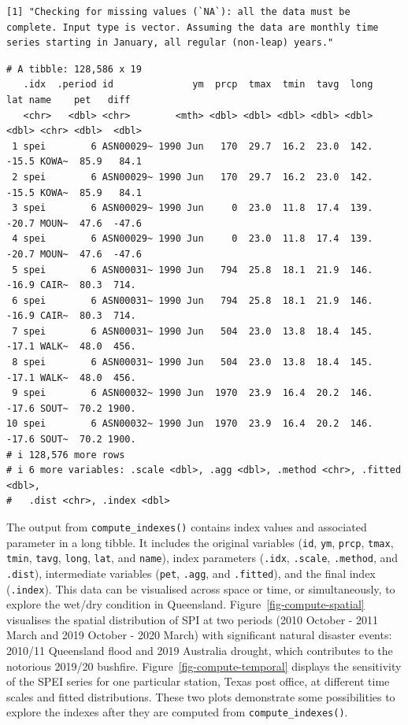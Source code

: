 \documentclass[
]{interact}
\begin{document}
\begin{verbatim}
[1] "Checking for missing values (`NA`): all the data must be complete. Input type is vector. Assuming the data are monthly time series starting in January, all regular (non-leap) years."
\end{verbatim}

\begin{verbatim}
# A tibble: 128,586 x 19
   .idx  .period id              ym  prcp  tmax  tmin  tavg  long   lat name    pet   diff
   <chr>   <dbl> <chr>        <mth> <dbl> <dbl> <dbl> <dbl> <dbl> <dbl> <chr> <dbl>  <dbl>
 1 spei        6 ASN00029~ 1990 Jun   170  29.7  16.2  23.0  142. -15.5 KOWA~  85.9   84.1
 2 spei        6 ASN00029~ 1990 Jun   170  29.7  16.2  23.0  142. -15.5 KOWA~  85.9   84.1
 3 spei        6 ASN00029~ 1990 Jun     0  23.0  11.8  17.4  139. -20.7 MOUN~  47.6  -47.6
 4 spei        6 ASN00029~ 1990 Jun     0  23.0  11.8  17.4  139. -20.7 MOUN~  47.6  -47.6
 5 spei        6 ASN00031~ 1990 Jun   794  25.8  18.1  21.9  146. -16.9 CAIR~  80.3  714. 
 6 spei        6 ASN00031~ 1990 Jun   794  25.8  18.1  21.9  146. -16.9 CAIR~  80.3  714. 
 7 spei        6 ASN00031~ 1990 Jun   504  23.0  13.8  18.4  145. -17.1 WALK~  48.0  456. 
 8 spei        6 ASN00031~ 1990 Jun   504  23.0  13.8  18.4  145. -17.1 WALK~  48.0  456. 
 9 spei        6 ASN00032~ 1990 Jun  1970  23.9  16.4  20.2  146. -17.6 SOUT~  70.2 1900. 
10 spei        6 ASN00032~ 1990 Jun  1970  23.9  16.4  20.2  146. -17.6 SOUT~  70.2 1900. 
# i 128,576 more rows
# i 6 more variables: .scale <dbl>, .agg <dbl>, .method <chr>, .fitted <dbl>,
#   .dist <chr>, .index <dbl>
\end{verbatim}

The output from \texttt{compute\_indexes()} contains index values and
associated parameter in a long tibble. It includes the original
variables (\texttt{id}, \texttt{ym}, \texttt{prcp}, \texttt{tmax},
\texttt{tmin}, \texttt{tavg}, \texttt{long}, \texttt{lat}, and
\texttt{name}), index parameters (\texttt{.idx}, \texttt{.scale},
\texttt{.method}, and \texttt{.dist}), intermediate variables
(\texttt{pet}, \texttt{.agg}, and \texttt{.fitted}), and the final index
(\texttt{.index}). This data can be visualised across space or time, or
simultaneously, to explore the wet/dry condition in Queensland.
Figure~\ref{fig-compute-spatial} visualises the spatial distribution of
SPI at two periods (2010 October - 2011 March and 2019 October - 2020
March) with significant natural disaster events: 2010/11 Queensland
flood and 2019 Australia drought, which contributes to the notorious
2019/20 bushfire. Figure~\ref{fig-compute-temporal} displays the
sensitivity of the SPEI series for one particular station, Texas post
office, at different time scales and fitted distributions. These two
plots demonstrate some possibilities to explore the indexes after they
are computed from \texttt{compute\_indexes()}.
\end{document}
